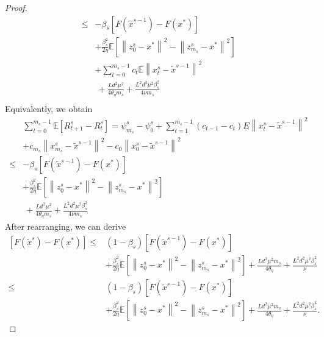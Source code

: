 \documentclass{article}
\newcommand*{\E}{\mathbb{E}}
\newcommand{\norm}[1]{\left\lVert#1\right\rVert}
\theoremstyle{definition}
\theoremstyle{remark}
\begin{document}
{\begin{proof}
\begin{equation}
\begin{split}
\leq &-\beta_s[F(\widetilde{x}^{s-1})-F(x^*)] \\
&+ {\frac{ \beta_s^2}{2\eta}}\E[\norm{z_{0}^s-x^*}^2-\norm{z_{m_s}^s-x^*}^2]\\
&+ \sum_{t=0}^{m_s-1} c_t\E\norm{x_t^s-\widetilde{x}^{s-1}}^2\\
&~+\frac{Ld^2\mu^2}{4\theta_{\eta}m_s}+\frac{ L^2d^2\mu^2\beta_s^2}{4\nu m_s}\\
\end{split}
\end{equation}
Equivalently, we obtain
\begin{equation}
\begin{split}
&\sum_{t=0}^{m_s-1} \E[R_{t+1}^s - R_{t}^s]= \psi_{m_s}^s- \psi_{0}^s + \sum_{t=1}^{m_s-1}(c_{t-1}-c_t)E\norm{x_t^s-\widetilde{x}^{s-1}}^2\\
&+c_{m_s}\norm{x_{m_s}^s-\widetilde{x}^{s-1}}^2-c_{0}\norm{x_{0}^s-\widetilde{x}^{s-1}}^2\\
\leq &-\beta_s[F(\widetilde{x}^{s-1})-F(x^*)] \\
&+ {\frac{ \beta_s^2}{2\eta}}\E[\norm{z_{0}^s-x^*}^2-\norm{z_{m_s}^s-x^*}^2]\\
&~+\frac{Ld^2\mu^2}{4\theta_{\eta}m_s}+\frac{ L^2d^2\mu^2\beta_s^2}{4\nu m_s}
\end{split}
\end{equation}
After rearranging, we can derive
\begin{equation}
\begin{split}
[F(\widetilde{x}^{s})-F(x^*)] \leq &(1-\beta_s)[F(\widetilde{x}^{s-1})-F(x^*)] \\
&+ {\frac{ \beta_s^2}{2\eta}}\E[\norm{z_{0}^s-x^*}^2-\norm{z_{m_s}^s-x^*}^2] +\frac{Ld^2\mu^2m_s}{4\theta_{\eta}}+\frac{L^2d^2\mu^2\beta_s^2}{\nu}\\
\leq &(1-\beta_s)[F(\widetilde{x}^{s-1})-F(x^*)] \\
&+ {\frac{ \beta_s^2}{2\eta}}\E[\norm{z_{0}^s-x^*}^2-\norm{z_{m_s}^s-x^*}^2]+\frac{Ld^2\mu^2m_s}{4\theta_{\eta}}+\frac{L^2d^2\mu^2\beta_s^2}{\nu}.
\end{split}
\end{equation}
\end{proof}
}
\end{document}
